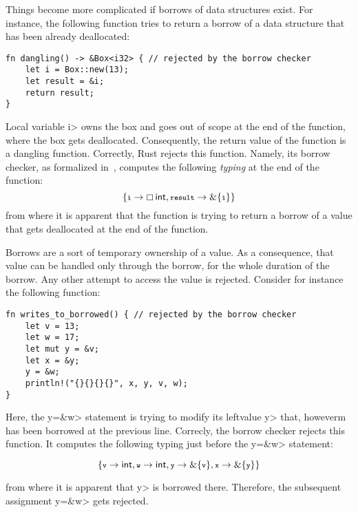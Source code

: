 Things become more complicated if borrows of data structures exist.
For instance, the following function tries to return a borrow of
a data structure that has been already deallocated:

\begin{verbatim}
fn dangling() -> &Box<i32> { // rejected by the borrow checker
    let i = Box::new(13);
    let result = &i;
    return result;
}
\end{verbatim}

\noindent
Local variable \<i> owns the box and goes out of scope at the end of the
function, where the box gets deallocated. Consequently, the return value of
the function is a dangling function. Correctly, Rust rejects this function.
Namely, its borrow checker, as formalized in~\cite{Pearce21}, computes the
following \emph{typing} at the end of the function:
\[
\{\<i>\to\boxtype{\mathsf{int},\<result>\to\borrow\{\<i>\}}\}
\]
from where it is apparent that the function is trying to return a borrow
of a value that gets deallocated at the end of the function.

Borrows are a sort of temporary ownership of a value. As a consequence,
that value can be handled only through the borrow, for the whole
duration of the borrow. Any other attempt to access the value is rejected.
Consider for instance the following function:

\begin{verbatim}
fn writes_to_borrowed() { // rejected by the borrow checker
    let v = 13;
    let w = 17;
    let mut y = &v;
    let x = &y;
    y = &w;
    println!("{}{}{}{}", x, y, v, w);
}
\end{verbatim}

\noindent
Here, the \<y=\&w> statement is trying to modify its leftvalue \<y>
that, howeverm has been borrowed at the previous line. Correcly, the borrow
checker rejects this function. It computes the following typing
just before the \<y=\&w> statement:

\[
\{\<v>\to\mathsf{int},\<w>\to\mathsf{int},\<y>\to\borrow\{\<v>\},\<x>\to\borrow\{\<y>\}\}
\]

\noindent
from where it is apparent that \<y> is borrowed there. Therefore,
the subsequent assignment \<y=\&w> gets rejected.
